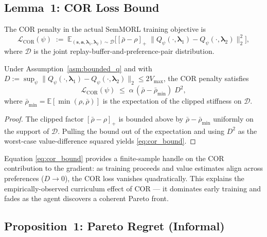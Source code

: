 \subsection{Lemma~1: COR Loss Bound}
\label{ssec:lemma1}

The COR penalty in the actual SemMORL training objective is
\begin{equation}
\label{eq:cor_loss}
\mathcal{L}_{\text{COR}}(\psi)
\;:=\;
\mathbb{E}_{(\mathbf{s},\mathbf{a},\bm{\lambda}_1,\bm{\lambda}_2)\sim
\mathcal{D}}
\Big[
[\bar\rho-\rho]_+\;
\big\|Q_\psi(\cdot,\bm{\lambda}_1)
      - Q_\psi(\cdot,\bm{\lambda}_2)\big\|_2^2
\Big],
\end{equation}
where $\mathcal{D}$ is the joint replay-buffer-and-preference-pair
distribution.

\begin{lemma}
\label{lem:cor_bound}
Under Assumption~\ref{asm:bounded_q} and with
$D := \sup_\psi
\big\|Q_\psi(\cdot,\bm{\lambda}_1)-Q_\psi(\cdot,\bm{\lambda}_2)\big\|_2
\le 2 V_{\max}$, the COR penalty satisfies
\begin{equation}
\label{eq:cor_bound}
\mathcal{L}_{\text{COR}}(\psi)
\;\le\;
\alpha\,(\bar{\rho} - \bar\rho_{\min})\;D^2,
\end{equation}
where $\bar\rho_{\min}=\mathbb{E}[\min(\rho,\bar\rho)]$ is the
expectation of the clipped stiffness on $\mathcal{D}$.
\end{lemma}

\begin{proof}
The clipped factor $[\bar\rho-\rho]_+$ is bounded above by
$\bar\rho-\bar\rho_{\min}$ uniformly on the support of $\mathcal{D}$.
Pulling the bound out of the expectation and using $D^2$ as the
worst-case value-difference squared yields \eqref{eq:cor_bound}.
\end{proof}

Equation \eqref{eq:cor_bound} provides a finite-sample handle on the
COR contribution to the gradient: as training proceeds and value
estimates align across preferences ($D\to0$), the COR loss vanishes
quadratically. This explains the empirically-observed curriculum
effect of COR --- it dominates early training and fades as the agent
discovers a coherent Pareto front.

\subsection{Proposition~1: Pareto Regret (Informal)}
\label{ssec:proposition1}

